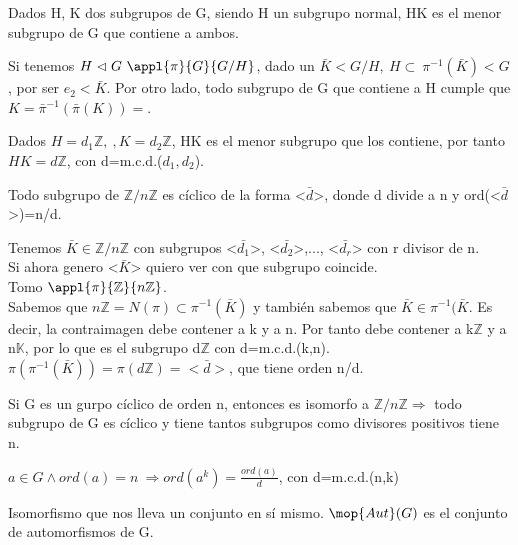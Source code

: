 \documentclass[nochap]{apuntes}
\begin{document}
\begin{defn}
Dados H, K dos subgrupos de G, siendo H un subgrupo normal, HK es el menor subgrupo de G que contiene a ambos.
\end{defn}

 Si tenemos $H \vartriangleleft G \ \appl{\pi}{G}{G/H}$, dado un $\bar{K} < G/H, \  H \subset \ \pi^{-1}(\bar{K}) < G $, por ser $e_2 < \bar{K}$. Por otro lado, todo subgrupo de G que contiene a H cumple que $K=\bar{\pi}^{-1}(\bar{\pi}(K))=$.

 \begin{example}
  Dados $H=d_1\mathbb{Z}, \ , K=d_2\mathbb{Z}$, HK es el menor subgrupo que los contiene, por tanto $HK=d\mathbb{Z}$, con d=m.c.d.($d_1, d_2$).
 \end{example}

 \begin{theorem}
  Todo subgrupo de $\mathbb{Z}/n\mathbb{Z}$  es cíclico de la forma <$\bar{d}$>, donde d divide a n y ord(<$\bar{d}$>)=n/d.
 \end{theorem}
\begin{example}
 Tenemos $\bar{K}\in \mathbb{Z}/n\mathbb{Z}$  con subgrupos <$\bar{d_1}$>, <$\bar{d_2}$>,..., <$\bar{d_r}$> con r divisor de n.\\
 Si ahora genero <$\bar{K}$> quiero ver con que subgrupo coincide.\\
 Tomo $\appl{\pi}{\mathbb{Z}}{n\mathbb{Z}}$.\\
 Sabemos que $n\mathbb{Z}=N(\pi) \subset \pi^{-1}(\bar{K})$  y también sabemos que $\bar{K} \in \pi^{-1}(\bar{K}$. Es decir,
 la contraimagen debe contener a k y a n. Por tanto debe contener a k$\mathbb{Z}$  y a n$\mathbb{K}$, por lo que es el subgrupo
 d$\mathbb{Z}$  con d=m.c.d.(k,n).\\
 $\pi(\pi^{-1}(\bar{K}))=\pi(d\mathbb{Z})=<\bar{d}>$, que tiene orden n/d.
\end{example}

Si G es un gurpo cíclico de orden n, entonces es isomorfo a $\mathbb{Z}/n\mathbb{Z} \Rightarrow$  todo subgrupo de G es cíclico y
tiene tantos subgrupos como divisores positivos tiene n.

\begin{theorem}
 $a\in G \wedge ord(a)=n \ \Rightarrow ord(a^{k})=\frac{ord(a)}{d}$, con d=m.c.d.(n,k)
\end{theorem}

\begin{defn}[Automorfismo]\label{defAutomorfismo}
 Isomorfismo que nos lleva un conjunto en sí mismo. $\mop{Aut}(G)$ es el conjunto de automorfismos de G.
\end{defn}
\end{document}
